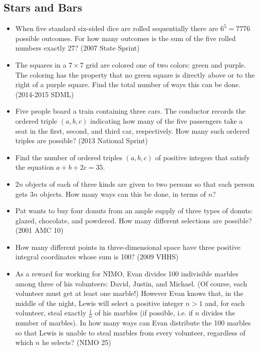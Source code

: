 \documentclass{article}
\begin{document}
\subsection{Stars and Bars}

\begin{itemize}

\item When five standard six-sided dice are rolled sequentially there are $6^5=7776$ possible outcomes. For how many outcomes is the sum of the five rolled numbers exactly 27? (2007 State Sprint)

\item The squares in a $7\times 7$ grid are colored one of two colors: green and purple. The coloring has the property that no green square is directly above or to the right of a purple square. Find the total number of ways this can be done. (2014-2015 SDML)

\item Five people board a train containing three cars. The conductor records the ordered triple $(a,b,c)$ indicating how many of the five passengers take a seat in the first, second, and third car, respectively. How many such ordered triples are possible? (2013 National Sprint)

%
\item Find the number of ordered triples $(a,b,c)$ of positive integers that satisfy the equation $a+b+2c=35$.

\item $2n$ objects of each of three kinds are given to two persons so that each person gets $3n$ objects. How many ways can this be done, in terms of $n$?

\item Pat wants to buy four donuts from an ample supply of three types of donuts: glazed, chocolate, and powdered. How many different selections are possible? (2001 AMC 10)

\item How many different points in three-dimensional space have three positive integral coordinates whose sum is 100? (2009 VHHS)

\item As a reward for working for NIMO, Evan divides 100 indivisible marbles among three of his volunteers: David, Justin, and Michael. (Of course, each volunteer must get at least one marble!) However Evan knows that, in the middle of the night, Lewis will select a positive integer $n>1$ and, for each volunteer, steal exactly $\frac{1}{n}$ of his marbles (if possible, i.e. if $n$ divides the number of marbles). In how many ways can Evan distribute the 100 marbles so that Lewis is unable to steal marbles from every volunteer, regardless of which $n$ he selects? (NIMO 25)


\end{itemize}
\end{document}
